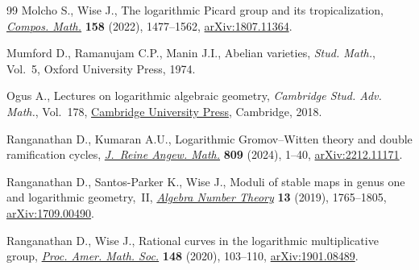 \documentclass[11pt]{article}
\numberwithin{equation}{section}
\numberwithin{equation}{section}
\theoremstyle{definition}
\begin{document}
\begin{thebibliography}{99}
Molcho S., Wise J., The logarithmic {P}icard group and its tropicalization,
 \href{https://doi.org/10.1112/s0010437x22007527}{\textit{Compos. Math.}}
 \textbf{158} (2022), 1477--1562,
 \href{http://arxiv.org/abs/1807.11364}{arXiv:1807.11364}.

Mumford D., Ramanujam C.P., Manin J.I., Abelian varieties, \textit{Stud.
 Math.}, Vol.~5, Oxford University Press, 1974.

Ogus A., Lectures on logarithmic algebraic geometry, \textit{Cambridge Stud.
 Adv. Math.}, Vol.~178, \href{https://doi.org/10.1017/9781316941614}{Cambridge
 University Press}, Cambridge, 2018.

Ranganathan D., Kumaran A.U., Logarithmic {G}romov--{W}itten theory and double
 ramification cycles,
 \href{https://doi.org/10.1515/crelle-2023-0100}{\textit{J.~Reine Angew.
 Math.}} \textbf{809} (2024), 1--40,
 \href{http://arxiv.org/abs/2212.11171}{arXiv:2212.11171}.

Ranganathan D., Santos-Parker K., Wise J., Moduli of stable maps in genus one
 and logarithmic geometry,~{II},
 \href{https://doi.org/10.2140/ant.2019.13.1765}{\textit{Algebra Number
 Theory}} \textbf{13} (2019), 1765--1805,
 \href{http://arxiv.org/abs/1709.00490}{arXiv:1709.00490}.

Ranganathan D., Wise J., Rational curves in the logarithmic multiplicative
 group, \href{https://doi.org/10.1090/proc/14749}{\textit{Proc. Amer. Math.
 Soc.}} \textbf{148} (2020), 103--110,
 \href{http://arxiv.org/abs/1901.08489}{arXiv:1901.08489}.

\end{thebibliography}
\end{document}
